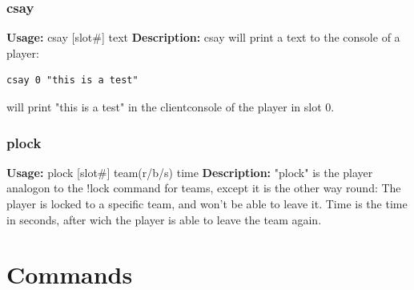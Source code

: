 \documentclass[12pt,a4paper]{article}
\begin{document}
\subsubsection{csay}
\textbf{Usage:} \hfill csay [slot\#] text \linebreak
\textbf{Description:} \linebreak
csay will print a text to the console of a player:
\begin{lstlisting}
csay 0 "this is a test"
\end{lstlisting}
will print "this is a test" in the clientconsole of the player in slot 0.

\subsubsection{plock}
\textbf{Usage:} \hfill plock [slot\#] team(r/b/s) time \linebreak
\textbf{Description:} \linebreak
"plock" is the player analogon to the !lock command for teams, except it is the other way round:
The player is locked to a specific team, and won't be able to leave it.
Time is the time in seconds, after wich the player is able to leave the team again.

\section{Commands}

\newcommand{\inclkwcmds}{ }
\newcommand{\inclkwadmins}{ }

\ifthenelse{\boolean{onKW}}{\inclkwcmds}{}
\ifthenelse{\boolean{onKW}}{\inclkwadmins}{}
\end{document}
